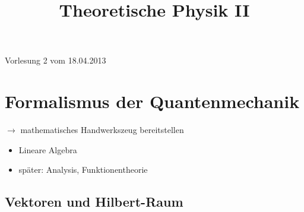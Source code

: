 \documentclass[10pt,article,colorback,accentcolor=tud9d]{scrartcl}
\title{Theoretische Physik II}
\begin{document}
\maketitle
\tableofcontents
\newpage
Vorlesung 2 vom 18.04.2013
\section{Formalismus der Quantenmechanik}
$\rightarrow$ mathematisches Handwerkszeug bereitstellen\\
\begin{itemize}
\item Lineare Algebra
\item später: Analysis, Funktionentheorie
\end{itemize}
\subsection{Vektoren und Hilbert-Raum}
\end{document}
